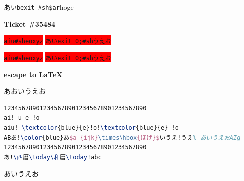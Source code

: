 \documentclass{ltjarticle}
\begin{document}
あ\lstinline[basicstyle=\tt]{いbexit #sh$ar}hoge

\bigskip
\textbf{Ticket \#35484}

\colorbox{red}{\lstinline!aiu#sheoxyz!}
\colorbox{red}{\lstinline!あいexit 0;#shうえお!}


\colorbox{red}{\lstinline{aiu#sheoxyz}}
\colorbox{red}{\lstinline{あいexit 0;#shうえお}}
\newpage

\bigskip
\textbf{escape to \LaTeX}

あおいうえお
\begin{lstlisting}[commentstyle=\color{green}\bfseries,
  frame=single,language=TeX, escapechar=!, basicstyle=\ttfamily,
  basewidth={0.5em, 0.5em},columns=fixed,doubleletterspace]
1234567890123456789012345678901234567890
ai! u e !o
aiu! \textcolor{blue}{e}!o!\textcolor{blue}{e} !o
ABあ!\color{blue}あ$a_{ijk}\times\hbox{ほげ}$いうえ!うえ% あいうえおAIg
1234567890123456789012345678901234567890
あ!\西暦\today\和暦\today!abc
\end{lstlisting}
あいうえお
\end{document}
